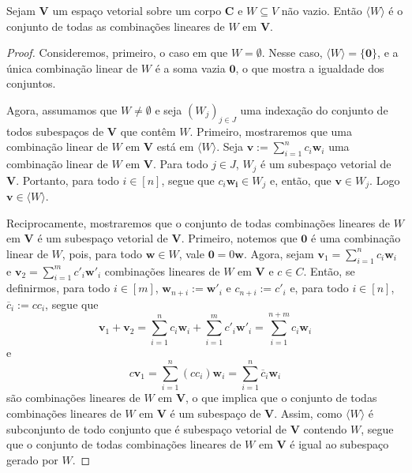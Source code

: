 \begin{teo}
	Sejam $\bm V$ um espaço vetorial sobre um corpo $\bm C$ e $W \subseteq V$ não vazio. Então $\langle W \rangle$ é o conjunto de todas as combinações lineares de $W$ em $\bm V$.
\end{teo}
\begin{proof}
	Consideremos, primeiro, o caso em que $W=\emptyset$. Nesse caso, $\langle W \rangle = \{\bm 0\}$, e a única combinação linear de $W$ é a soma vazia $\bm 0$, o que mostra a igualdade dos conjuntos.

	Agora, assumamos que $W \neq \emptyset$ e seja $(W_j)_{j \in J}$ uma indexação do conjunto de todos subespaços de $\bm V$ que contêm $W$. Primeiro, mostraremos que uma combinação linear de $W$ em $\bm V$ está em $\langle W \rangle$. Seja $\bm v := \sum_{i=1}^n c_i\bm w_i$ uma combinação linear de $W$ em $\bm V$. Para todo $j \in J$, $W_j$ é um subespaço vetorial de $\bm V$. Portanto, para todo $i \in [n]$, segue que $c_i \bm{w_i} \in W_j$ e, então, que $\bm v \in W_j$. Logo $\bm v \in \langle W \rangle$.

	Reciprocamente, mostraremos que o conjunto de todas combinações lineares de $W$ em $\bm V$ é um subespaço vetorial de $\bm V$. Primeiro, notemos que $\bm 0$ é uma combinação linear de $W$, pois, para todo $\bm w \in W$, vale $\bm 0 = 0\bm w$. Agora, sejam $\bm v_1 = \sum_{i=1}^n c_i\bm w_i$ e $\bm v_2 = \sum_{i=1}^m c'_i\bm w'_i$ combinações lineares de $W$ em $\bm V$ e $c \in C$. Então, se definirmos, para todo $i \in [m]$, $\bm w_{n+i} := \bm w'_i$ e $c_{n+i} := c'_i$ e, para todo $i \in [n]$, $\overline c_i := cc_i$, segue que
	\begin{equation*}
	\bm v_1 + \bm v_2 = \sum_{i=1}^n c_i\bm w_i + \sum_{i=1}^m c'_i\bm w'_i = \sum_{i=1}^{n+m} c_i\bm w_i
	\end{equation*}
e
	\begin{equation*}
	c\bm v_1 = \sum_{i=1}^n (cc_i)\bm w_i = \sum_{i=1}^n \overline c_i \bm w_i
	\end{equation*}
são combinações lineares de $W$ em $\bm V$, o que implica que o conjunto de todas combinações lineares de $W$ em $\bm V$ é um subespaço de $\bm V$. Assim, como $\langle W \rangle$ é subconjunto de todo conjunto que é subespaço vetorial de $\bm V$ contendo $W$, segue que o conjunto de todas combinações lineares de $W$ em $\bm V$ é igual ao subespaço gerado por $W$.
\end{proof}


